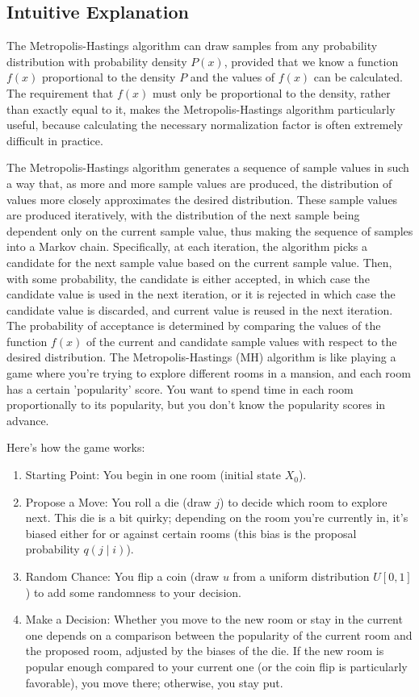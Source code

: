\documentclass{article}
\begin{document}
\subsection{Intuitive Explanation}
The Metropolis-Hastings algorithm can draw samples from any probability distribution with probability density $P(x)$, provided that we know a function $f(x)$ proportional to the density $P$ and the values of $f(x)$ can be calculated. The requirement that $f(x)$ must only be proportional to the density, rather than exactly equal to it, makes the Metropolis-Hastings algorithm particularly useful, because calculating the necessary normalization factor is often extremely difficult in practice.

The Metropolis-Hastings algorithm generates a sequence of sample values in such a way that, as more and more sample values are produced, the distribution of values more closely approximates the desired distribution. These sample values are produced iteratively, with the distribution of the next sample being dependent only on the current sample value, thus making the sequence of samples into a Markov chain. Specifically, at each iteration, the algorithm picks a candidate for the next sample value based on the current sample value. Then, with some probability, the candidate is either accepted, in which case the candidate value is used in the next iteration, or it is rejected in which case the candidate value is discarded, and current value is reused in the next iteration. The probability of acceptance is determined by comparing the values of the function $f(x)$ of the current and candidate sample values with respect to the desired distribution.
The Metropolis-Hastings (MH) algorithm is like playing a game where you're trying to explore different rooms in a mansion, and each room has a certain 'popularity' score. You want to spend time in each room proportionally to its popularity, but you don't know the popularity scores in advance.

Here's how the game works:
\begin{enumerate}
    \item Starting Point: You begin in one room (initial state \( X_0 \)).
    \item Propose a Move: You roll a die (draw \( j \)) to decide which room to explore next. This die is a bit quirky; depending on the room you're currently in, it's biased either for or against certain rooms (this bias is the proposal probability \( q(j \mid i) \)).
    \item  Random Chance: You flip a coin (draw \( u \) from a uniform distribution \( U[0,1] \)) to add some randomness to your decision.
    \item Make a Decision: Whether you move to the new room or stay in the current one depends on a comparison between the popularity of the current room and the proposed room, adjusted by the biases of the die. If the new room is popular enough compared to your current one (or the coin flip is particularly favorable), you move there; otherwise, you stay put.
\end{enumerate}
\end{document}
